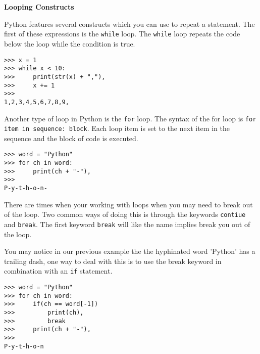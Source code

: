 \documentclass[letterpaper,11pt]{article}
\begin{document}
\\ \\
\textbf{Looping Constructs}
\par{Python features several constructs which you can use to repeat a statement.
The first of these expressions is the \texttt{while} loop. The \texttt{while}
loop repeats the code below the loop while the condition is true.}
\\
\begin{minipage}{.5\textwidth}
    \begin{tcolorbox}
        \begin{footnotesize}
            \begin{verbatim}
>>> x = 1
>>> while x < 10:
>>>     print(str(x) + ","),
>>>     x += 1
>>>
1,2,3,4,5,6,7,8,9,
            \end{verbatim}
        \end{footnotesize}
    \end{tcolorbox}
\end{minipage}
\par{Another type of loop in Python is the \texttt{for} loop. The syntax of the
for loop is \texttt{for item in sequence: block}. Each loop item is set to the
next item in the sequence and the block of code is executed.}
\\
\begin{minipage}{.5\textwidth}
    \begin{tcolorbox}
        \begin{footnotesize}
            \begin{verbatim}
>>> word = "Python"
>>> for ch in word:
>>>     print(ch + "-"),
>>>
P-y-t-h-o-n-
            \end{verbatim}
        \end{footnotesize}
    \end{tcolorbox}
\end{minipage}
\par{There are times when your working with loops when you may need to break out
of the loop. Two common ways of doing this is through the keywords
\texttt{contiue} and \texttt{break}. The first keyword \texttt{break} will like
the name implies break you out of the loop.}
\par{You may notice in our previous example the the hyphinated word 'Python' has
a trailing dash, one way to deal with this is to use the break keyword in
combination with an \texttt{if} statement.} 
\\
\begin{minipage}{.5\textwidth}
    \begin{tcolorbox}
        \begin{footnotesize}
            \begin{verbatim}
>>> word = "Python"
>>> for ch in word:
>>>     if(ch == word[-1])
>>>         print(ch), 
>>>         break
>>>     print(ch + "-"),
>>>
P-y-t-h-o-n
            \end{verbatim}
        \end{footnotesize}
    \end{tcolorbox}
\end{minipage}
\end{document}
